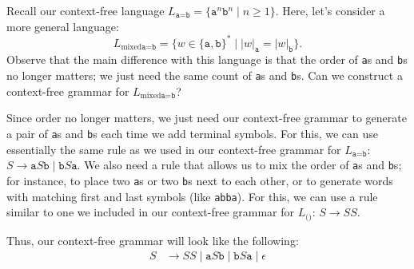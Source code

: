 \begin{example}
Recall our context-free language $L_{\texttt{a}=\texttt{b}} = \{\texttt{a}^{n}\texttt{b}^{n} \mid n \geq 1\}$. Here, let's consider a more general language:
\begin{equation*}
L_{\text{mixed}\texttt{a}=\texttt{b}} = \{w \in \{\texttt{a}, \texttt{b}\}^{*} \mid |w|_{\texttt{a}} = |w|_{\texttt{b}}\}.
\end{equation*}
Observe that the main difference with this language is that the order of \texttt{a}s and \texttt{b}s no longer matters; we just need the same count of \texttt{a}s and \texttt{b}s. Can we construct a context-free grammar for $L_{\text{mixed}\texttt{a}=\texttt{b}}$?

Since order no longer matters, we just need our context-free grammar to generate a pair of \texttt{a}s and \texttt{b}s each time we add terminal symbols. For this, we can use essentially the same rule as we used in our context-free grammar for $L_{\texttt{a}=\texttt{b}}$: $S \rightarrow \texttt{a}S\texttt{b} \mid \texttt{b}S\texttt{a}$. We also need a rule that allows us to mix the order of \texttt{a}s and \texttt{b}s; for instance, to place two \texttt{a}s or two \texttt{b}s next to each other, or to generate words with matching first and last symbols (like \texttt{abba}). For this, we can use a rule similar to one we included in our context-free grammar for $L_{\texttt{()}}$: $S \rightarrow SS$.

Thus, our context-free grammar will look like the following:
\begin{align*}
S	&\rightarrow SS \mid \texttt{a}S\texttt{b} \mid \texttt{b}S\texttt{a} \mid \epsilon
\end{align*}
\end{example}


